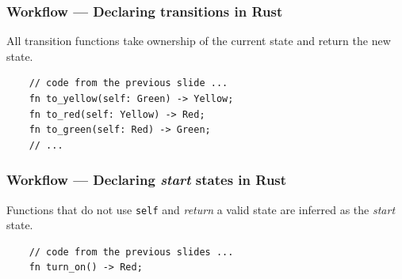 \documentclass[bigger,notes,aspectratio=169]{beamer}
\begin{document}
\begin{frame}[fragile]
    \frametitle{Workflow --- Declaring transitions in Rust}
    All transition functions take ownership of the current state and return the new state.
    \begin{listing}
        \centering
        \begin{verbatim}
    // code from the previous slide ...
    fn to_yellow(self: Green) -> Yellow;
    fn to_red(self: Yellow) -> Red;
    fn to_green(self: Red) -> Green;
    // ...
        \end{verbatim}
    \end{listing}

\end{frame}

\begin{frame}[fragile]
    \frametitle{Workflow --- Declaring \emph{start} states in Rust}
    Functions that do not use \texttt{self} and \emph{return} a valid state are inferred as the \emph{start} state.

    \begin{listing}
        \centering
        \begin{verbatim}
    // code from the previous slides ...
    fn turn_on() -> Red;
        \end{verbatim}
    \end{listing}

\end{frame}
\end{document}
